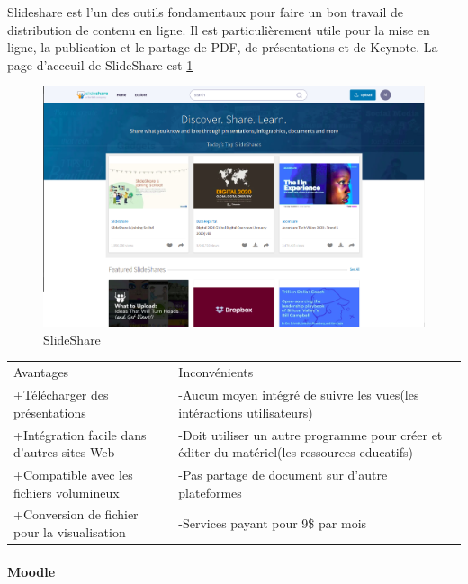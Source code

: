 \documentclass[12pt]{report}
\begin{document}
Slideshare est l’un des outils fondamentaux pour faire un bon travail de distribution de contenu en ligne. Il est particulièrement utile pour la mise en ligne, la publication et le partage de PDF, de présentations et de Keynote. La page d'acceuil de SlideShare est \ref{fig:slideshare}
\begin{figure}[h]
    \centering
    \includegraphics[width=.8\textwidth]{slideshare}
    \caption{SlideShare}
    \label{fig:slideshare}
\end{figure}

\begin{table}[h!]
\begin{center}
\begin{tabular}{ p{8cm}  p{8cm}  }
Avantages & Inconvénients \\
+Télécharger des présentations & -Aucun moyen intégré de suivre les vues(les intéractions utilisateurs) \\ 
+Intégration facile dans d'autres sites Web & -Doit utiliser un autre programme pour créer et éditer du matériel(les ressources educatifs) \\
+Compatible avec les fichiers volumineux & -Pas partage de document sur d'autre plateformes \\
+Conversion de fichier pour la visualisation & -Services payant pour 9\$ par mois \\
\end{tabular}
\end{center}
\end{table}
\newpage
\paragraph{Moodle}
\end{document}
